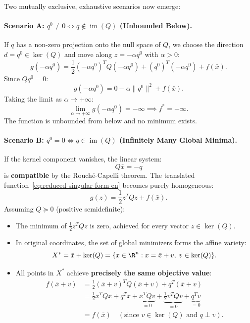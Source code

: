 Two mutually exclusive, exhaustive scenarios now emerge:

\paragraph{Scenario A: $q^0 \neq 0 \iff q \notin \operatorname{im}(Q)$ (Unbounded Below).}
If $q$ has a non-zero projection onto the null space of $Q$, we choose the direction $d = q^0 \in \ker(Q)$ and move along $z = -\alpha q^0$ with $\alpha > 0$:
\begin{equation}
    g(-\alpha q^0) = \frac{1}{2} (-\alpha q^0)^T Q (-\alpha q^0) + (q^0)^T (-\alpha q^0) + f(\bar{x}).
\end{equation}
Since $Q q^0 = 0$:
\begin{equation}
    g(-\alpha q^0) = 0 - \alpha \|q^0\|^2 + f(\bar{x}).
\end{equation}
Taking the limit as $\alpha \to +\infty$:
\begin{equation}
    \lim_{\alpha \to +\infty} g(-\alpha q^0) = -\infty \implies f^* = -\infty.
\end{equation}
The function is unbounded from below and no minimum exists.

\paragraph{Scenario B: $q^0 = 0 \iff q \in \operatorname{im}(Q)$ (Infinitely Many Global Minima).}
If the kernel component vanishes, the linear system:
\begin{equation}
    Q \bar{x} = -q
\end{equation}
is \textbf{compatible} by the Rouch\'e-Capelli theorem. The translated function~\eqref{eq:reduced-singular-form-en} becomes purely homogeneous:
\begin{equation}
    g(z) = \frac{1}{2} z^T Q z + f(\bar{x}).
\end{equation}
Assuming $Q \succeq 0$ (positive semidefinite):
\begin{itemize}
    \item The minimum of $\frac{1}{2} z^T Q z$ is zero, achieved for every vector $z \in \ker(Q)$.
    \item In original coordinates, the set of global minimizers forms the affine variety:
    \begin{equation}
        X^* = \bar{x} + \ker(Q) = \{x \in \R^n : x = \bar{x} + v, \; v \in \ker(Q)\}.
    \end{equation}
    \item All points in $X^*$ achieve \textbf{precisely the same objective value}:
    \begin{align}
        f(\bar{x} + v) &= \frac{1}{2} (\bar{x} + v)^T Q (\bar{x} + v) + q^T (\bar{x} + v) \nonumber \\
        &= \frac{1}{2} \bar{x}^T Q \bar{x} + q^T \bar{x} + \underbrace{\bar{x}^T Q v}_{= 0} + \underbrace{\frac{1}{2} v^T Q v}_{= 0} + \underbrace{q^T v}_{= 0} \nonumber \\
        &= f(\bar{x}) \quad (\text{since } v \in \ker(Q) \text{ and } q \perp v).
    \end{align}
\end{itemize}

